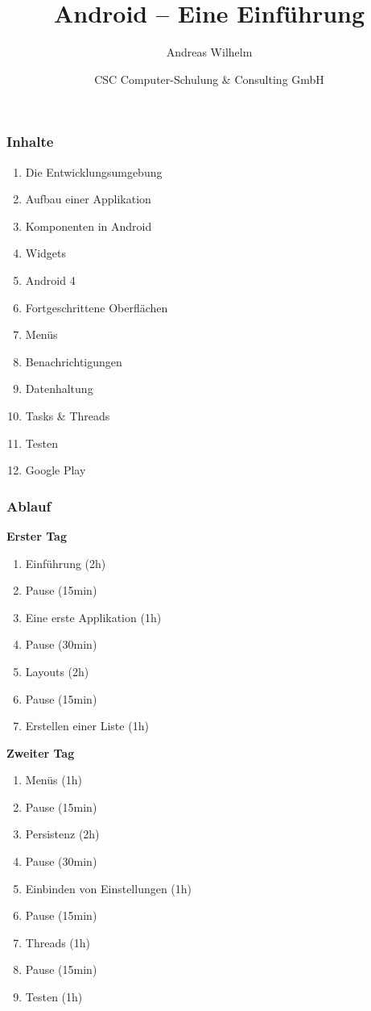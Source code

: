 \title{Android -- Eine Einführung}
\author[A. Wilhelm]{Andreas Wilhelm}
\titlegraphic{}
\date{CSC Computer-Schulung \& Consulting GmbH}

\begin{frame}[plain]
  \titlepage
\end{frame}

\begin{frame}
   \frametitle{Inhalte}
   \begin{enumerate}
		\item Die Entwicklungsumgebung
		\item Aufbau einer Applikation
		\item Komponenten in Android
		\item Widgets
		\item Android 4
		\item Fortgeschrittene Oberflächen
		\item Menüs
		\item Benachrichtigungen
		\item Datenhaltung
		\item Tasks \& Threads
		\item Testen
		\item Google Play
   \end{enumerate}
\end{frame}

\begin{frame}
   \frametitle{Ablauf}
   
   \textbf{Erster Tag}\\
   \begin{enumerate}
		\item Einführung (2h)
		\item Pause (15min)
		\item Eine erste Applikation (1h)
		\item Pause (30min)
		\item Layouts (2h)
		\item Pause (15min)
		\item Erstellen einer Liste (1h)
   \end{enumerate}
   
   \textbf{Zweiter Tag}\\
   \begin{enumerate}
		\item Menüs (1h)
		\item Pause (15min)
		\item Persistenz (2h)
		\item Pause (30min)
		\item Einbinden von Einstellungen (1h)
		\item Pause (15min)
		\item Threads (1h)
		\item Pause (15min)
		\item Testen (1h)
   \end{enumerate}
\end{frame}


